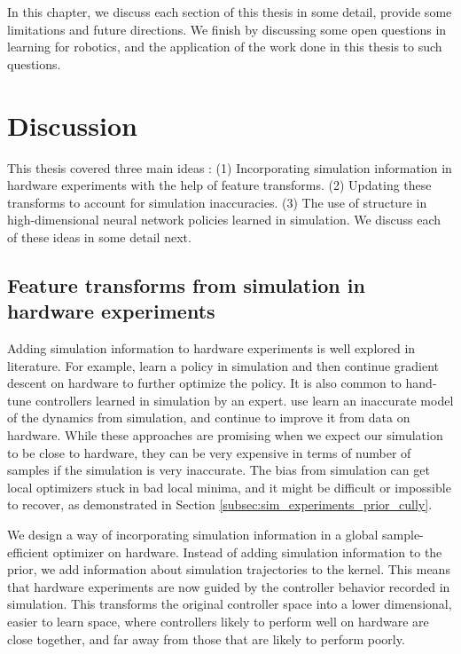 In this chapter, we discuss each section of this thesis in some detail, provide some limitations and future directions. We finish by discussing some open questions in learning for robotics, and the application of the work done in this thesis to such questions.


\section{Discussion}
This thesis covered three main ideas : (1) Incorporating simulation information in hardware experiments with the help of feature transforms. (2) Updating these transforms to account for simulation inaccuracies. (3) The use of structure in high-dimensional neural network policies learned in simulation. 
We discuss each of these ideas in some detail next.

\subsection{Feature transforms from simulation in hardware experiments}

Adding simulation information to hardware experiments is well explored in literature. For example, \cite{endo2008learning} learn a policy in simulation and then continue gradient descent on hardware to further optimize the policy. It is also common to hand-tune controllers learned in simulation by an expert.  \cite{abbeel2006using} use learn an inaccurate model of the dynamics from simulation, and continue to improve it from data on hardware. While these approaches are promising when we expect our simulation to be close to hardware, they can be very expensive in terms of number of samples if the simulation is very inaccurate. The bias from simulation can get local optimizers stuck in bad local minima, and it might be difficult or impossible to recover, as demonstrated in Section \ref{subsec:sim_experiments_prior_cully}.

We design a way of incorporating simulation information in a global sample-efficient optimizer on hardware. Instead of adding simulation information to the prior, we add information about simulation trajectories to the kernel. This means that hardware experiments are now guided by the controller behavior recorded in simulation. This transforms the original controller space into a lower dimensional, easier to learn space, where controllers likely to perform well on hardware are close together, and far away from those that are likely to perform poorly.

